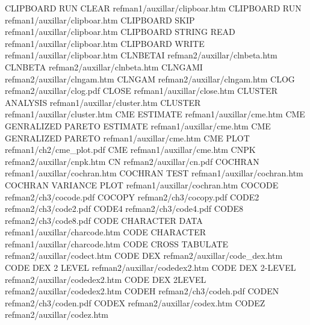 CLIPBOARD RUN CLEAR                     refman1/auxillar/clipboar.htm
CLIPBOARD RUN                           refman1/auxillar/clipboar.htm
CLIPBOARD SKIP                          refman1/auxillar/clipboar.htm
CLIPBOARD STRING READ                   refman1/auxillar/clipboar.htm
CLIPBOARD WRITE                         refman1/auxillar/clipboar.htm
CLNBETAI                                refman2/auxillar/clnbeta.htm
CLNBETA                                 refman2/auxillar/clnbeta.htm
CLNGAMI                                 refman2/auxillar/clngam.htm
CLNGAM                                  refman2/auxillar/clngam.htm
CLOG                                    refman2/auxillar/clog.pdf
CLOSE                                   refman1/auxillar/close.htm
CLUSTER ANALYSIS                        refman1/auxillar/cluster.htm
CLUSTER                                 refman1/auxillar/cluster.htm
CME ESTIMATE                            refman1/auxillar/cme.htm
CME GENRALIZED PARETO ESTIMATE          refman1/auxillar/cme.htm
CME GENRALIZED PARETO                   refman1/auxillar/cme.htm
CME PLOT                                refman1/ch2/cme_plot.pdf
CME                                     refman1/auxillar/cme.htm
CNPK                                    refman2/auxillar/cnpk.htm
CN                                      refman2/auxillar/cn.pdf
COCHRAN                                 refman1/auxillar/cochran.htm
COCHRAN TEST                            refman1/auxillar/cochran.htm
COCHRAN VARIANCE PLOT                   refman1/auxillar/cochran.htm
COCODE                                  refman2/ch3/cocode.pdf
COCOPY                                  refman2/ch3/cocopy.pdf
CODE2                                   refman2/ch3/code2.pdf
CODE4                                   refman2/ch3/code4.pdf
CODE8                                   refman2/ch3/code8.pdf
CODE CHARACTER DATA                     refman1/auxillar/charcode.htm
CODE CHARACTER                          refman1/auxillar/charcode.htm
CODE CROSS TABULATE                     refman2/auxillar/codect.htm
CODE DEX                                refman2/auxillar/code_dex.htm
CODE DEX 2 LEVEL                        refman2/auxillar/codedex2.htm
CODE DEX 2-LEVEL                        refman2/auxillar/codedex2.htm
CODE DEX 2LEVEL                         refman2/auxillar/codedex2.htm
CODEH                                   refman2/ch3/codeh.pdf
CODEN                                   refman2/ch3/coden.pdf
CODEX                                   refman2/auxillar/codex.htm
CODEZ                                   refman2/auxillar/codez.htm
